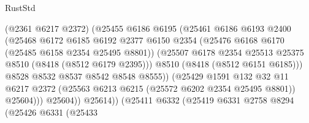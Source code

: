 \begin{lexlean}{RustStd}
\begin{coremodule}
                                        (@2361 @6217 @2372)
                                        (@25455
                                          @6186
                                          @6195
                                          (@25461
                                            @6186
                                            @6193
                                            @2400
                                            (@25468
                                              @6172
                                              @6185
                                              @6192
                                              @2377
                                              @6150
                                              @2354
                                              (@25476 @6168 @6170 (@25485 @6158 @2354 @25495 @8801))
                                              (@25507
                                                @6178
                                                @2354
                                                @25513
                                                @25375
                                                @8510
                                                (@8418 (@8512 @6179 @2395)))
                                              @8510
                                              (@8418 (@8512 @6151 @6185)))
                                            @8528
                                            @8532
                                            @8537
                                            @8542
                                            @8548
                                            @8555))
                                        (@25429
                                          @1591
                                          @132
                                          @32
                                          @11
                                          @6217
                                          @2372
                                          (@25563 @6213 @6215 (@25572 @6202 @2354 @25495 @8801))
                                          @25604)))
                                    @25604))
                                @25614))
                            (@25411
                              @6332
                              (@25419
                                @6331
                                @2758
                                @8294
                                (@25426
                                  @6331
                                  (@25433

\end{coremodule}
\end{lexlean}
